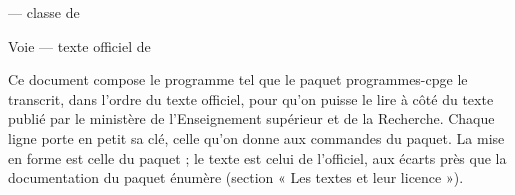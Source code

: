 \documentclass[a4paper,11pt]{article}
\begin{document}
\begin{center}
  {\LARGE {} — classe de \par}
  \medskip
  {\large Voie  — texte officiel de \par}
\end{center}

\noindent Ce document compose le programme tel que le paquet \textsf{programmes-cpge} le transcrit, dans l'ordre du texte officiel, pour qu'on puisse le lire à côté du texte publié par le ministère de l'Enseignement supérieur et de la Recherche. Chaque ligne porte en petit sa clé, celle qu'on donne aux commandes du paquet. La mise en forme est celle du paquet ; le texte est celui de l'officiel, aux écarts près que la documentation du paquet énumère (section « Les textes et leur licence »).

\tableofcontents
\clearpage
\cpgeprogramme[numeros]{\filiere}
\end{document}

